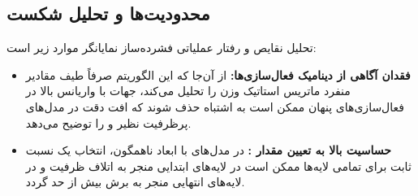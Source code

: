\subsection{محدودیت‌ها و تحلیل شکست}
تحلیل نقایص و رفتار عملیاتی فشرده‌ساز  نمایانگر موارد زیر است:
\begin{itemize}
    \item \textbf{فقدان آگاهی از دینامیک فعال‌سازی‌ها:} از آن‌جا که این الگوریتم صرفاً طیف مقادیر منفرد ماتریس استاتیک وزن را تحلیل می‌کند، جهات با واریانس بالا در فعال‌سازی‌های پنهان ممکن است به اشتباه حذف شوند که افت دقت در مدل‌های پرظرفیت نظیر  و  را توضیح می‌دهد.
    \item \textbf{حساسیت بالا به تعیین مقدار :} در مدل‌های با ابعاد ناهمگون، انتخاب یک نسبت ثابت برای تمامی لایه‌ها ممکن است در لایه‌های ابتدایی منجر به اتلاف ظرفیت و در لایه‌های انتهایی منجر به برش بیش از حد گردد.
\end{itemize}
